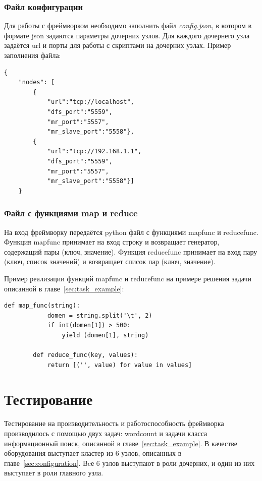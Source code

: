 \documentclass[12pt,a4paper,oneside]{extarticle}
\begin{document}
        \subsubsection{Файл конфигурации}
            Для работы с фреймворком необходимо заполнить файл {\it config.json}, в котором в формате json задаются параметры дочерних узлов. Для каждого дочернего узла задаётся url и порты для работы с скриптами на дочерних узлах. Пример заполнения файла:
            \lstset{language=C}
            \begin{lstlisting}[mathescape] 
    {
    "nodes": [
        {
            "url":"tcp://localhost",
            "dfs_port":"5559",
            "mr_port":"5557",
            "mr_slave_port":"5558"},
        {
            "url":"tcp://192.168.1.1",
            "dfs_port":"5559",
            "mr_port":"5557",
            "mr_slave_port":"5558"}]
    }
            \end{lstlisting}
        \subsubsection{Файл с функциями map и reduce}
            \label{sec:task_sample}

            На вход фреймворку передаётся python файл с функциями map\textunderscore func и reduce\textunderscore func. Функция map\textunderscore func принимает на вход строку и возвращает генератор, содержащий пары (ключ, значение). Функция reduce\textunderscore func принимает на вход пару (ключ, список значений) и возвращает список пар (ключ, значение).

            Пример реализации функций map\textunderscore func и reduce\textunderscore func на примере решения задачи описанной в главе~\ref{sec:task_example}:
            \lstset{language=Python}
            \begin{lstlisting}[mathescape] 
        def map_func(string):
            domen = string.split('\t', 2)
            if int(domen[1]) > 500:
                yield (domen[1], string)

        def reduce_func(key, values):
            return [('', value) for value in values]
            \end{lstlisting}


\clearpage

\section{Тестирование}
\label{sec:tests}
    Тестирование на производительность и работоспособность фреймворка производилось с помощью двух задач: wordcount и задачи класса информационный поиск, описанной в главе~\ref{sec:task_example}.
    В качестве оборудования выступает кластер из 6 узлов, описанных в главе~\ref{sec:configuration}. Вcе 6 узлов выступают в роли дочерних, и один из них выступает в роли главного узла.
\end{document}
